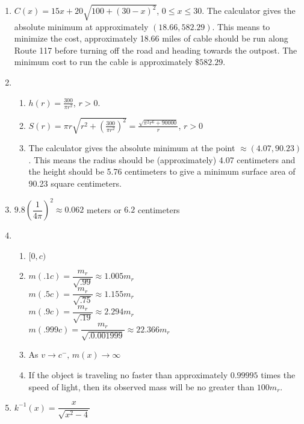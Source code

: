 \begin{exenum}
\begin{mfigure}
\caption{}
\label{fig:gteqcuberootetc}
\end{mfigure}

\end{exenum}

\begin{enumerate}
\setcounter{enumi}{\value{HW}}

\item $C(x) = 15x+20\sqrt{100+(30-x)^2}$, $0 \leq x \leq 30$.  The calculator gives the absolute minimum at approximately $(18.66, 582.29)$.  This means to minimize the cost, approximately 18.66 miles of cable should be run along Route 117 before turning off the road and heading towards the outpost.  The minimum cost to run the cable is approximately $\$582.29$.

\item 

\begin{enumerate}
\item  $h(r) = \frac{300}{\pi r^2}$, $r > 0$.
\item  $S(r) = \pi r \sqrt{r^2+\left(\frac{300}{\pi r^2}\right)^2} = \frac{\sqrt{\pi^2 r^6+90000}}{r}$, $r>0$
\item  The calculator gives the absolute minimum at the point $\approx (4.07, 90.23)$.  This means the radius should be (approximately) 4.07 centimeters and the height should be 5.76 centimeters to give a minimum surface area of 90.23 square centimeters.

\end{enumerate}

\item $9.8 \left(\dfrac{1}{4\pi}\right)^{2} \approx 0.062$ meters or $6.2$ centimeters

\item \begin{enumerate}

\item $[0, c)$

\item
$m(.1c) = \dfrac{m_{r}}{\sqrt{.99}} \approx 1.005m_{r}$\\
$m(.5c) = \dfrac{m_{r}}{\sqrt{.75}} \approx 1.155m_{r}$\\
$m(.9c) = \dfrac{m_{r}}{\sqrt{.19}} \approx 2.294m_{r}$\\
$m(.999c) = \dfrac{m_{r}}{\sqrt{.0.001999}} \approx 22.366m_{r}$ 

\item As $v \rightarrow c^{-}, \, m(x) \rightarrow \infty$

\item If the object is traveling no faster than approximately $0.99995$ times the speed of light, then its observed mass will be no greater than $100m_{r}$.

\end{enumerate}

\item $k^{-1}(x) = \dfrac{x}{\sqrt{x^{2} - 4}}$

\end{enumerate}
